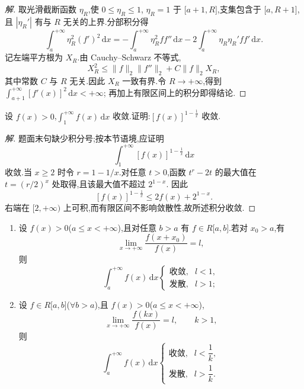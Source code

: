 \documentclass[../../数学分析培优讲义(答案版).tex]{subfiles}
\begin{document}
\begin{proof}[解]
取光滑截断函数 $\eta_R$,使 $0\leq\eta_R\leq1$,
$\eta_R=1$ 于 $\lbrack a+1,R\rbrack$,支集包含于
$\lbrack a,R+1\rbrack$,且 $|\eta_R'|$ 有与 $R$ 无关的上界.分部积分得
\[
    \int_a^{+\infty}\eta_R^2(f')^2\,\mathrm{d}x
    =-\int_a^{+\infty}\eta_R^2ff''\,\mathrm{d}x
    -2\int_a^{+\infty}\eta_R\eta_R'ff'\,\mathrm{d}x.
\]
记左端平方根为 $X_R$.由 Cauchy--Schwarz 不等式,
\[
    X_R^2
    \leq\|f\|_2\|f''\|_2+C\|f\|_2X_R,
\]
其中常数 $C$ 与 $R$ 无关.因此 $X_R$ 一致有界.令 $R\to+\infty$,得到
$\displaystyle\int_{a+1}^{+\infty}[f'(x)]^2\,\mathrm{d}x<+\infty$;
再加上有限区间上的积分即得结论.
\end{proof}

\begin{example}
设 $f(x)>0$,$\displaystyle\int_1^{+\infty}f(x)\,\mathrm{d}x$ 收敛.证明:$[f(x)]^{1-\frac{1}{x}}$ 收敛.
\end{example}

\begin{proof}[解]
题面末句缺少积分号;按本节语境,应证明
\[
    \int_1^{+\infty}[f(x)]^{1-\frac{1}{x}}\,\mathrm{d}x
\]
收敛.当 $x\geq2$ 时令 $r=1-1/x$.对任意 $t>0$,函数
$t^r-2t$ 的最大值在 $t=(r/2)^x$ 处取得,且该最大值不超过 $2^{1-x}$.
因此
\[
    [f(x)]^{1-\frac{1}{x}}\leq2f(x)+2^{1-x}.
\]
右端在 $\lbrack2,+\infty)$ 上可积,而有限区间不影响敛散性,故所述积分收敛.
\end{proof}

\begin{example}
\begin{enumerate}[label=(\arabic*)]
    \item 设 $f(x)>0$($a\leq x<+\infty$),且对任意 $b>a$ 有 $f\in R\lbrack a,b\rbrack$.若对 $x_0>a$,有
    \[
        \lim\limits_{x\to+\infty}\dfrac{f(x+x_0)}{f(x)}=l,
    \]
    则
    \[
        \int_a^{+\infty}f(x)\,\mathrm{d}x
        \begin{cases}
            \text{收敛},&l<1,\\
            \text{发散},&l>1;
        \end{cases}
    \]
    \item 设 $f\in R\lbrack a,b\rbrack$($\forall b>a$),且 $f(x)>0$($a\leq x<+\infty$),
    \[
        \lim\limits_{x\to+\infty}\dfrac{f(kx)}{f(x)}=l,
        \qquad k>1,
    \]
    则
    \[
        \int_a^{+\infty}f(x)\,\mathrm{d}x
        \begin{cases}
            \text{收敛},&l<\dfrac{1}{k},\\
            \text{发散},&l>\dfrac{1}{k}.
        \end{cases}
    \]
\end{enumerate}
\end{example}
\end{document}
